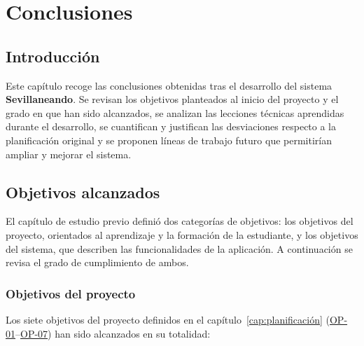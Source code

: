 \chapter{Conclusiones}\label{cap:conclusiones}

\section{Introducción}

Este capítulo recoge las conclusiones obtenidas tras el desarrollo del sistema \textbf{Sevillaneando}. Se revisan los objetivos planteados al inicio del proyecto y el grado en que han sido alcanzados, se analizan las lecciones técnicas aprendidas durante el desarrollo, se cuantifican y justifican las desviaciones respecto a la planificación original y se proponen líneas de trabajo futuro que permitirían ampliar y mejorar el sistema.

\section{Objetivos alcanzados}

El capítulo de estudio previo definió dos categorías de objetivos: los objetivos del proyecto, orientados al aprendizaje y la formación de la estudiante, y los objetivos del sistema, que describen las funcionalidades de la aplicación. A continuación se revisa el grado de cumplimiento de ambos.

\subsection{Objetivos del proyecto}

Los siete objetivos del proyecto definidos en el capítulo~\ref{cap:planificación} (\hyperref[op:01]{OP-01}--\hyperref[op:07]{OP-07}) han sido alcanzados en su totalidad:

